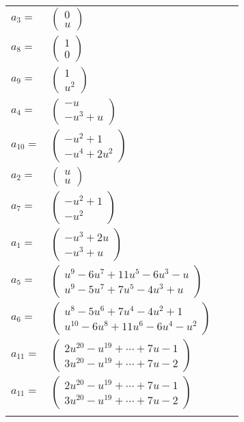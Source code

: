 \documentclass[1p]{elsarticle_modified}
\theoremstyle{definition}
\begin{document}
\begin{tabular}{m{7pt} m{180pt} m{7pt} m{180pt} }
\flushright $a_{3}=$&$\begin{pmatrix}0\\u\end{pmatrix}$ \\
\flushright $a_{8}=$&$\begin{pmatrix}1\\0\end{pmatrix}$ \\
\flushright $a_{9}=$&$\begin{pmatrix}1\\u^2\end{pmatrix}$ \\
\flushright $a_{4}=$&$\begin{pmatrix}- u\\- u^3+u\end{pmatrix}$ \\
\flushright $a_{10}=$&$\begin{pmatrix}- u^2+1\\- u^4+2 u^2\end{pmatrix}$ \\
\flushright $a_{2}=$&$\begin{pmatrix}u\\u\end{pmatrix}$ \\
\flushright $a_{7}=$&$\begin{pmatrix}- u^2+1\\- u^2\end{pmatrix}$ \\
\flushright $a_{1}=$&$\begin{pmatrix}- u^3+2 u\\- u^3+u\end{pmatrix}$ \\
\flushright $a_{5}=$&$\begin{pmatrix}u^9-6 u^7+11 u^5-6 u^3- u\\u^9-5 u^7+7 u^5-4 u^3+u\end{pmatrix}$ \\
\flushright $a_{6}=$&$\begin{pmatrix}u^8-5 u^6+7 u^4-4 u^2+1\\u^{10}-6 u^8+11 u^6-6 u^4- u^2\end{pmatrix}$ \\
\flushright $a_{11}=$&$\begin{pmatrix}2 u^{20}- u^{19}+\cdots+7 u-1\\3 u^{20}- u^{19}+\cdots+7 u-2\end{pmatrix}$\\ \flushright $a_{11}=$&$\begin{pmatrix}2 u^{20}- u^{19}+\cdots+7 u-1\\3 u^{20}- u^{19}+\cdots+7 u-2\end{pmatrix}$\\&\end{tabular}
\end{document}
